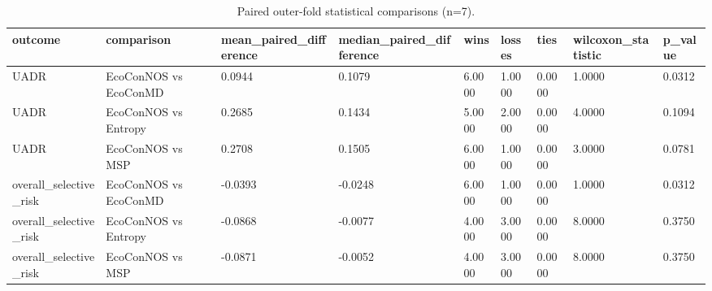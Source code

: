 \begin{table}
\caption{Paired outer-fold statistical comparisons (n=7).}
\label{tab:table10_statistical_tests}
\begin{tabular}{lllllllll}
\toprule
outcome & comparison & mean\_paired\_difference & median\_paired\_difference & wins & losses & ties & wilcoxon\_statistic & p\_value \\
\midrule
UADR & EcoConNOS vs EcoConMD & 0.0944 & 0.1079 & 6.0000 & 1.0000 & 0.0000 & 1.0000 & 0.0312 \\
UADR & EcoConNOS vs Entropy & 0.2685 & 0.1434 & 5.0000 & 2.0000 & 0.0000 & 4.0000 & 0.1094 \\
UADR & EcoConNOS vs MSP & 0.2708 & 0.1505 & 6.0000 & 1.0000 & 0.0000 & 3.0000 & 0.0781 \\
overall\_selective\_risk & EcoConNOS vs EcoConMD & -0.0393 & -0.0248 & 6.0000 & 1.0000 & 0.0000 & 1.0000 & 0.0312 \\
overall\_selective\_risk & EcoConNOS vs Entropy & -0.0868 & -0.0077 & 4.0000 & 3.0000 & 0.0000 & 8.0000 & 0.3750 \\
overall\_selective\_risk & EcoConNOS vs MSP & -0.0871 & -0.0052 & 4.0000 & 3.0000 & 0.0000 & 8.0000 & 0.3750 \\
\bottomrule
\end{tabular}
\end{table}

